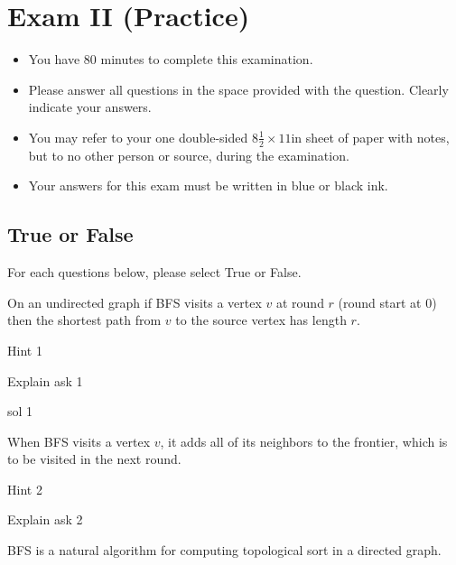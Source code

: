 \chapter{Exam II (Practice)}
\label{ch:examii-practice}

\begin{preamble}
\begin{itemize}
\item You have 80 minutes to complete this examination.
\item Please answer all questions in the space provided with the
  question.  Clearly indicate your answers.
\item You may refer to your one double-sided $8\frac{1}{2} \times 11$in
  sheet of paper with notes, but to no other person or source, during the
  examination.

\item Your answers for this exam must be written in blue or black ink.

\end{itemize}
\end{preamble}


\section{True or False}

\begin{problem}[14.][BFS]
For each questions below, please select True or False.

\asktf[2.0]

On an undirected graph if  BFS visits a vertex $v$ at round $r$ (round
start at $0$) then the shortest path from $v$ to the source vertex has
length $r$.

\hint
Hint 1

\explain 
Explain  ask 1

\solt

\explain  sol 1

\asktf

When BFS visits a vertex $v$, it adds all of its neighbors to the
frontier, which is to be visited in the next round.

\hint
Hint 2

\explain 
Explain  ask 2

\solf

\asktf

BFS is a natural algorithm for computing topological sort in a directed graph.

\solf

\end{problem}

